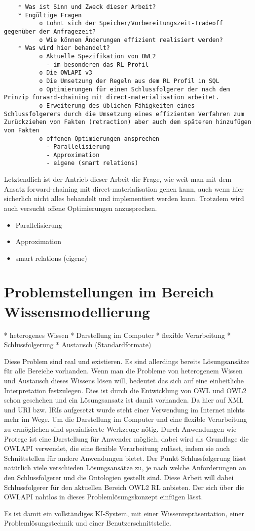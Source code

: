 \begin{verbatim}
    * Was ist Sinn und Zweck dieser Arbeit?
    * Engültige Fragen
          o Lohnt sich der Speicher/Vorbereitungszeit-Tradeoff gegenüber der Anfragezeit?
          o Wie können Änderungen effizient realisiert werden? 
    * Was wird hier behandelt?
          o Aktuelle Spezifikation von OWL2
            - im besonderen das RL Profil
          o Die OWLAPI v3
          o Die Umsetzung der Regeln aus dem RL Profil in SQL
          o Optimierungen für einen Schlussfolgerer der nach dem Prinzip forward-chaining mit direct-materialisation arbeitet.
          o Erweiterung des üblichen Fähigkeiten eines Schlussfolgerers durch die Umsetzung eines effizienten Verfahren zum Zurückziehen von Fakten (retraction) aber auch dem späteren hinzufügen von Fakten
          o offenen Optimierungen ansprechen
            - Parallelisierung
            - Approximation
            - eigene (smart relations)
\end{verbatim}

Letztendlich ist der Antrieb dieser Arbeit die Frage, wie weit man mit dem Ansatz forward-chaining mit direct-materialisation gehen kann, auch wenn hier sicherlich nicht alles behandelt und implementiert werden kann. Trotzdem wird auch versucht offene Optimierungen anzusprechen.

\begin{itemize}
  \item Parallelisierung
  \item Approximation
  \item smart relations (eigene)
\end{itemize}

\section{Problemstellungen im Bereich Wissensmodellierung}
 * heterogenes Wissen
 * Darstellung im Computer
 * flexible Verarbeitung
 * Schlussfolgerung
 * Austausch (Standardformate)

Diese Problem sind real und existieren. Es sind allerdings bereits Lösungsansätze für alle Bereiche vorhanden. Wenn man die Probleme von heterogenem Wissen und Austausch dieses Wissens lösen will, bedeutet das sich auf eine einheitliche Interpretation festzulegen. Dies ist durch die Entwicklung von OWL und OWL2 schon geschehen und ein Lösungsansatz ist damit vorhanden. Da hier auf XML und URI bzw. IRIs aufgesetzt wurde steht einer Verwendung im Internet nichts mehr im Wege. Um die Darstellung im Computer und eine flexible Verarbeitung zu ermöglichen sind spezialisierte Werkzeuge nötig. Durch Anwendungen wie Protege ist eine Darstellung für Anwender möglich, dabei wird als Grundlage die OWLAPI verwendet, die eine flexible Verarbeitung zulässt, indem sie auch Schnittstellen für andere Anwendungen bietet. Der Punkt Schlussfolgerung lässt natürlich viele verschieden Lösungsansätze zu, je nach welche Anforderungen an den Schlussfolgerer und die Ontologien gestellt sind. Diese Arbeit will dabei Schlussfolgerer für den aktuellen Bereich OWL2 RL anbieten. Der sich über die OWLAPI nahtlos in dieses Problemlösungskonzept einfügen lässt.

Es ist damit ein vollständiges KI-System, mit einer Wissenrepräsentation, einer Problemlösungstechnik und einer Benutzerschnittstelle.

